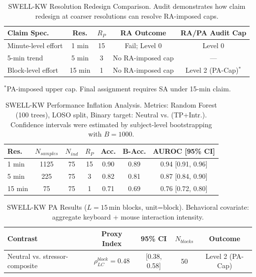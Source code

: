 \documentclass[journal]{IEEEtran}
\begin{document}
\begin{table}[t!]
\caption{SWELL-KW Resolution Redesign Comparison. Audit demonstrates how claim redesign at coarser resolutions can resolve RA-imposed caps.}
\label{tab:swell_redesign}
\centering
\begin{tabular}{@{}lcccc@{}}
\toprule
\textbf{Claim Spec.} & \textbf{Res.} & \textbf{$R_P$} & \textbf{RA Outcome} & \textbf{RA/PA Audit Cap} \\
\midrule
Minute-level effort & 1 min & 15 & Fail; Level 0 & Level 0 \\
5-min trend         & 5 min & 3 & No RA-imposed cap & --- \\
Block-level effort  & 15 min & 1 & No RA-imposed cap & Level 2 (PA-Cap)$^*$ \\
\bottomrule
\end{tabular}
\smallskip
\begin{center}
\small $^*$PA-imposed upper cap. Final assignment requires SA under 15-min claim.
\end{center}
\end{table}

\begin{table}[t!]
\caption{SWELL-KW Performance Inflation Analysis. Metrics: Random Forest (100 trees), LOSO split, Binary target: Neutral vs. (TP+Intr.). Confidence intervals were estimated by subject-level bootstrapping with $B = 1000$.}
\label{tab:swell_performance}
\centering
\begin{tabular}{@{}lcccccc@{}}
\toprule
\textbf{Res.} & \textbf{$N_{samples}$} & \textbf{$N_{ind}$} & \textbf{$R_P$} & \textbf{Acc.} & \textbf{B-Acc.} & \textbf{AUROC [95\% CI]} \\
\midrule
1 min  & 1125 & 75 & 15 & 0.90 & 0.89 & 0.94 [0.91, 0.96] \\
5 min  & 225  & 75 & 3  & 0.82 & 0.81 & 0.87 [0.84, 0.90] \\
15 min & 75   & 75 & 1  & 0.71 & 0.69 & 0.76 [0.72, 0.80] \\
\bottomrule
\end{tabular}
\end{table}

\begin{table}[h!]
\caption{SWELL-KW PA Results ($L=15$\,min blocks, unit=block). Behavioral covariate: aggregate keyboard + mouse interaction intensity.}
\label{tab:swell_pa}
\centering
\begin{tabular}{@{}lcccc@{}}
\toprule
\textbf{Contrast} & \textbf{Proxy Index} & \textbf{95\% CI} & \textbf{$N_{blocks}$} & \textbf{Outcome} \\
\midrule
Neutral vs. stressor-composite & $\rho^{block}_{LC}=0.48$ & [0.38, 0.58] & 50 & Level 2 (PA-Cap) \\
\bottomrule
\end{tabular}
\end{table}
\end{document}
